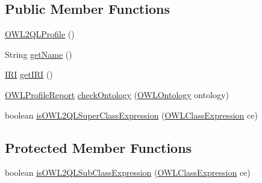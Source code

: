 \subsection*{Public Member Functions}
\begin{DoxyCompactItemize}
\item 
\hyperlink{classorg_1_1semanticweb_1_1owlapi_1_1profiles_1_1_o_w_l2_q_l_profile_a29d3cb1bcb467a98d1bcbc9c9b9dc9df}{O\-W\-L2\-Q\-L\-Profile} ()
\item 
String \hyperlink{classorg_1_1semanticweb_1_1owlapi_1_1profiles_1_1_o_w_l2_q_l_profile_a00aa850f75b13af020d4f6647040a0d1}{get\-Name} ()
\item 
\hyperlink{classorg_1_1semanticweb_1_1owlapi_1_1model_1_1_i_r_i}{I\-R\-I} \hyperlink{classorg_1_1semanticweb_1_1owlapi_1_1profiles_1_1_o_w_l2_q_l_profile_a5d27c73f07a21ea96e3df0a9a1eb62e3}{get\-I\-R\-I} ()
\item 
\hyperlink{classorg_1_1semanticweb_1_1owlapi_1_1profiles_1_1_o_w_l_profile_report}{O\-W\-L\-Profile\-Report} \hyperlink{classorg_1_1semanticweb_1_1owlapi_1_1profiles_1_1_o_w_l2_q_l_profile_a547f575c1f1589f8a0b35fffd317c88e}{check\-Ontology} (\hyperlink{interfaceorg_1_1semanticweb_1_1owlapi_1_1model_1_1_o_w_l_ontology}{O\-W\-L\-Ontology} ontology)
\item 
boolean \hyperlink{classorg_1_1semanticweb_1_1owlapi_1_1profiles_1_1_o_w_l2_q_l_profile_a561e47bc36d9cf346d0d9d3233dd9991}{is\-O\-W\-L2\-Q\-L\-Super\-Class\-Expression} (\hyperlink{interfaceorg_1_1semanticweb_1_1owlapi_1_1model_1_1_o_w_l_class_expression}{O\-W\-L\-Class\-Expression} ce)
\end{DoxyCompactItemize}
\subsection*{Protected Member Functions}
\begin{DoxyCompactItemize}
\item 
boolean \hyperlink{classorg_1_1semanticweb_1_1owlapi_1_1profiles_1_1_o_w_l2_q_l_profile_a82cc5de938ce4a000484be3ac9a5faf9}{is\-O\-W\-L2\-Q\-L\-Sub\-Class\-Expression} (\hyperlink{interfaceorg_1_1semanticweb_1_1owlapi_1_1model_1_1_o_w_l_class_expression}{O\-W\-L\-Class\-Expression} ce)
\end{DoxyCompactItemize}
